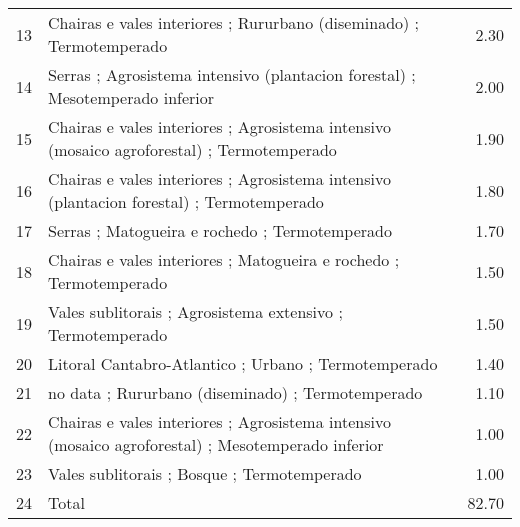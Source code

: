 \begin{table}[p]
\begin{tabular}{rlr}
  13 & Chairas e vales interiores ; Rururbano (diseminado) ; Termotemperado & 2.30 \\ 
  14 & Serras ; Agrosistema intensivo (plantacion forestal) ; Mesotemperado inferior & 2.00 \\ 
  15 & Chairas e vales interiores ; Agrosistema intensivo (mosaico agroforestal) ; Termotemperado & 1.90 \\ 
  16 & Chairas e vales interiores ; Agrosistema intensivo (plantacion forestal) ; Termotemperado & 1.80 \\ 
  17 & Serras ; Matogueira e rochedo ; Termotemperado & 1.70 \\ 
  18 & Chairas e vales interiores ; Matogueira e rochedo ; Termotemperado & 1.50 \\ 
  19 & Vales sublitorais ; Agrosistema extensivo ; Termotemperado & 1.50 \\ 
  20 & Litoral Cantabro-Atlantico ; Urbano ; Termotemperado & 1.40 \\ 
  21 & no data ; Rururbano (diseminado) ; Termotemperado & 1.10 \\ 
  22 & Chairas e vales interiores ; Agrosistema intensivo (mosaico agroforestal) ; Mesotemperado inferior & 1.00 \\ 
  23 & Vales sublitorais ; Bosque ; Termotemperado & 1.00 \\ 
  24 & Total & 82.70 \\ 
   \hline
\end{tabular}
\end{table}
